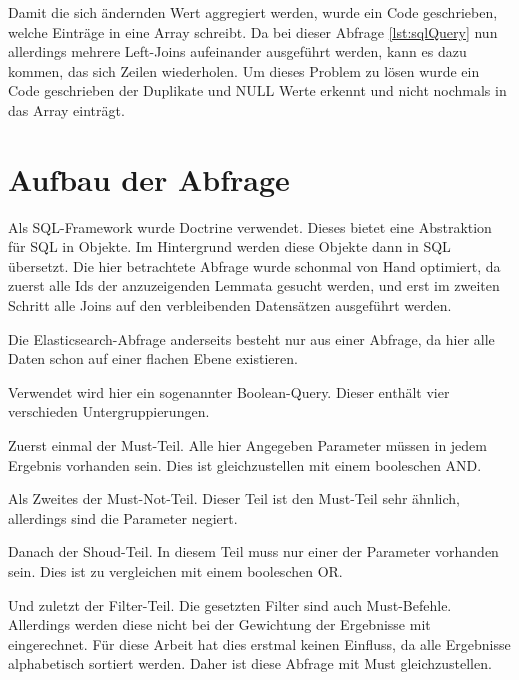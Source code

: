 Damit die sich ändernden Wert aggregiert werden, wurde ein Code geschrieben, welche Einträge in eine Array schreibt. Da bei dieser Abfrage \ref{lst:sqlQuery} nun allerdings mehrere Left-Joins aufeinander ausgeführt werden, kann es dazu kommen, das sich Zeilen wiederholen. Um dieses Problem zu lösen wurde ein Code geschrieben der Duplikate und NULL Werte erkennt und nicht nochmals in das Array einträgt.

\section{Aufbau der Abfrage}

Als SQL-Framework wurde Doctrine verwendet. Dieses bietet eine Abstraktion für SQL in Objekte. Im Hintergrund werden diese Objekte dann in SQL übersetzt. Die hier betrachtete Abfrage wurde schonmal von Hand optimiert, da zuerst alle Ids der anzuzeigenden Lemmata gesucht werden, und erst im zweiten Schritt alle Joins auf den verbleibenden Datensätzen ausgeführt werden.

Die Elasticsearch-Abfrage anderseits besteht nur aus einer Abfrage, da hier alle Daten schon auf einer flachen Ebene existieren.

Verwendet wird hier ein sogenannter Boolean-Query. Dieser enthält vier verschieden Untergruppierungen.

Zuerst einmal der Must-Teil. Alle hier Angegeben Parameter müssen in jedem Ergebnis vorhanden sein. Dies ist gleichzustellen mit einem booleschen AND. 

Als Zweites der Must-Not-Teil. Dieser Teil ist den Must-Teil sehr ähnlich, allerdings sind die Parameter negiert.

Danach der Shoud-Teil. In diesem Teil muss nur einer der Parameter vorhanden sein. Dies ist zu vergleichen mit einem booleschen OR. 

Und zuletzt der Filter-Teil. Die gesetzten Filter sind auch Must-Befehle. Allerdings werden diese nicht bei der Gewichtung der Ergebnisse mit eingerechnet. Für diese Arbeit hat dies erstmal keinen Einfluss, da alle Ergebnisse alphabetisch sortiert werden. Daher ist diese Abfrage mit Must gleichzustellen. \cite{ElasticsearchB.V..17.12.2019}


